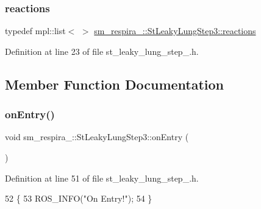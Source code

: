 \subsubsection{\texorpdfstring{reactions}{reactions}}
{\footnotesize\ttfamily typedef mpl\+::list$<$ $>$ \hyperlink{structsm__respira__1_1_1StLeakyLungStep3_a5f16ee57548be4a1487c0dc6c9965737}{sm\+\_\+respira\+\_\+::\+St\+Leaky\+Lung\+Step3\+::reactions}}



Definition at line 23 of file st\+\_\+leaky\+\_\+lung\+\_\+step\+\_.\+h.



\subsection{Member Function Documentation}
\mbox{\label{structsm__respira__1_1_1StLeakyLungStep3_a3e1a20f54d35bc8d6a8add4a7815907e}} 
\subsubsection{\texorpdfstring{on\+Entry()}{onEntry()}}
{\footnotesize\ttfamily void sm\+\_\+respira\+\_\+::\+St\+Leaky\+Lung\+Step3\+::on\+Entry (\begin{DoxyParamCaption}{ }\end{DoxyParamCaption})\hspace{0.3cm}{\ttfamily [inline]}}



Definition at line 51 of file st\+\_\+leaky\+\_\+lung\+\_\+step\+\_.\+h.


\begin{DoxyCode}
52     \{
53         ROS\_INFO(\textcolor{stringliteral}{"On Entry!"});
54     \}
\end{DoxyCode}
\mbox{\label{structsm__respira__1_1_1StLeakyLungStep3_ae10c075f4084328d4b17c918225ab7d1}} 
